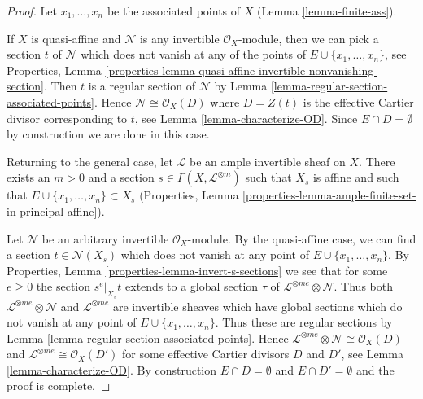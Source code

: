 \documentclass[10pt,a4paper]{amsart}
\theoremstyle{plain}
\theoremstyle{definition}
\theoremstyle{remark}
\numberwithin{equation}{subsection}
\begin{document}
\begin{proof}
Let $x_1, \ldots, x_n$ be the associated points of $X$
(Lemma \ref{lemma-finite-ass}).

\medskip\noindent
If $X$ is quasi-affine and $\mathcal{N}$ is any invertible
$\mathcal{O}_X$-module, then we can pick a section $t$ of
$\mathcal{N}$ which does not vanish at any of the points
of $E \cup \{x_1, \ldots, x_n\}$, see Properties, Lemma
\ref{properties-lemma-quasi-affine-invertible-nonvanishing-section}.
Then $t$ is a regular section of $\mathcal{N}$ by
Lemma \ref{lemma-regular-section-associated-points}.
Hence $\mathcal{N} \cong \mathcal{O}_X(D)$ where
$D = Z(t)$ is the effective Cartier divisor corresponding to $t$, see
Lemma \ref{lemma-characterize-OD}. Since $E \cap D = \emptyset$
by construction we are done in this case.

\medskip\noindent
Returning to the general case, let $\mathcal{L}$ be an ample invertible sheaf
on $X$. There exists an $m > 0$ and a section
$s \in \Gamma(X, \mathcal{L}^{\otimes m})$ such that $X_s$
is affine and such that $E \cup \{x_1, \ldots, x_n\} \subset X_s$
(Properties, Lemma \ref{properties-lemma-ample-finite-set-in-principal-affine}).

\medskip\noindent
Let $\mathcal{N}$ be an arbitrary invertible $\mathcal{O}_X$-module.
By the quasi-affine case, we can find a section
$t \in \mathcal{N}(X_s)$ which does not vanish at any point
of $E \cup \{x_1, \ldots, x_n\}$.
By Properties, Lemma \ref{properties-lemma-invert-s-sections}
we see that for some $e \geq 0$ the section $s^e|_{X_s} t$ extends to
a global section $\tau$ of $\mathcal{L}^{\otimes me} \otimes \mathcal{N}$.
Thus both $\mathcal{L}^{\otimes me} \otimes \mathcal{N}$ and
$\mathcal{L}^{\otimes me}$ are invertible sheaves which have global sections
which do not vanish at any point of $E \cup \{x_1, \ldots, x_n\}$.
Thus these are regular sections by
Lemma \ref{lemma-regular-section-associated-points}.
Hence $\mathcal{L}^{\otimes me} \otimes \mathcal{N} \cong \mathcal{O}_X(D)$
and $\mathcal{L}^{\otimes me} \cong \mathcal{O}_X(D')$ for some
effective Cartier divisors $D$ and $D'$, see Lemma \ref{lemma-characterize-OD}.
By construction $E \cap D = \emptyset$ and $E \cap D' = \emptyset$
and the proof is complete.
\end{proof}
\end{document}
